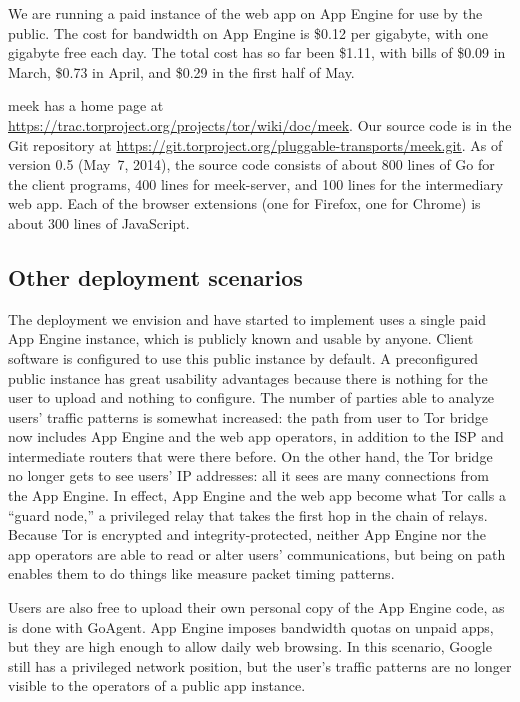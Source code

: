 \documentclass{article}
\def\meekserver{\mbox{meek-server}}
\begin{document}
We are running a paid instance of the web app on App Engine for use by the public.
The cost for bandwidth on App Engine is \$0.12 per gigabyte,
with one gigabyte free each day.
The total cost has so far been \$1.11, with bills of
\$0.09 in March,
\$0.73 in April,
and \$0.29 in the first half of May.

meek has a home page at
\url{https://trac.torproject.org/projects/tor/wiki/doc/meek}.
Our source code is in the Git repository at
\url{https://git.torproject.org/pluggable-transports/meek.git}.
As of version 0.5 (May~7, 2014), the source code consists of
about 800 lines of Go for the client programs,
400 lines for \meekserver, and
100 lines for the intermediary web app.
Each of the browser extensions
(one for Firefox, one for Chrome)
is about 300 lines of JavaScript.

\subsection{Other deployment scenarios}
\label{sec:otherdeployment}

The deployment we envision and have started to implement
uses a single paid App Engine instance, which is publicly known and usable by anyone.
Client software is configured to use this public instance by default.
A preconfigured public instance has great usability advantages
because there is nothing for the user to upload and nothing to configure.
The number of parties able to analyze users' traffic patterns is somewhat increased:
the path from user to Tor bridge now includes App Engine and the web app operators,
in addition to the ISP and intermediate routers that were there before.
On the other hand, the Tor bridge no longer gets to see users' IP addresses:
all it sees are many connections from the App Engine.
In effect, App Engine and the web app become what Tor calls a ``guard node,''
a privileged relay that takes the first hop in the chain of relays.
Because Tor is encrypted and integrity-protected, neither App Engine nor the app operators
are able to read or alter users' communications, but being on path enables them
to do things like measure packet timing patterns.

Users are also free to upload their own personal copy of the App Engine code, as is done with GoAgent.
App Engine imposes bandwidth quotas on unpaid apps, but they are high enough to allow daily web browsing.
In this scenario, Google still has a privileged network position,
but the user's traffic patterns are no longer visible to the operators of a public app instance.
\end{document}
